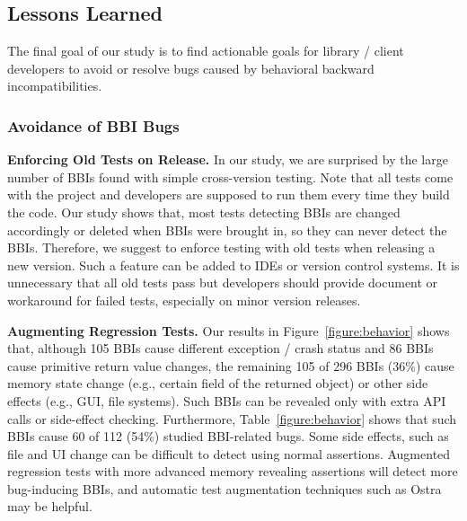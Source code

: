 

		

\subsection{Lessons Learned}
		
The final goal of our study is to find actionable goals for library / client developers to avoid or resolve bugs caused by behavioral backward incompatibilities. 


\subsubsection{Avoidance of BBI Bugs}
\textbf{Enforcing Old Tests on Release.} In our study, we are surprised by the large number of BBIs found with simple cross-version testing. Note that all tests come with the project and developers are supposed to run them every time they build the code. Our study shows that, most tests detecting BBIs are changed accordingly or deleted when BBIs were brought in, so they can never detect the BBIs. Therefore, we suggest to enforce testing with old tests when releasing a new version. Such a feature can be added to IDEs or version control systems. It is unnecessary that all old tests pass but developers should provide document or workaround for failed tests, especially on minor version releases. 

\textbf{Augmenting Regression Tests.} Our results in Figure~\ref{figure:behavior} shows that, although 105 BBIs cause different exception / crash status and 86 BBIs cause primitive return value changes, the remaining 105 of 296 BBIs (36\%) cause memory state change (e.g., certain field of the returned object) or other side effects (e.g., GUI, file systems). Such BBIs can be revealed only with extra API calls or side-effect checking. Furthermore, Table~\ref{figure:behavior} shows that such BBIs cause 60 of 112 (54\%) studied BBI-related bugs. Some side effects, such as file and UI change can be difficult to detect using normal assertions. Augmented regression tests with more advanced memory revealing assertions will detect more bug-inducing BBIs, and automatic test augmentation techniques such as Ostra~\cite{OOPSLA06} may be helpful. 



